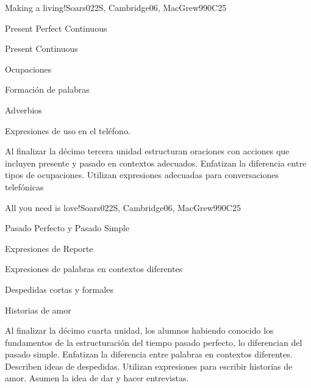 \begin{syllabus}
\begin{unit}{Making a living!}{}{Soars022S, Cambridge06, MacGrew99}{0}{C25}
   \begin{topics}
      \item Present Perfect Continuous
      \item Present Continuous
      \item Ocupaciones 
      \item Formación de palabras
      \item Adverbios
      \item Expresiones de uso en el teléfono.
   \end{topics}

   \begin{learningoutcomes}
      \item Al finalizar la décimo tercera unidad estructuran oraciones con acciones que incluyen presente y pasado en contextos adecuados. Enfatizan la diferencia entre tipos de ocupaciones. Utilizan expresiones adecuadas para conversaciones telefónicas
   \end{learningoutcomes}
\end{unit}

\begin{unit}{All you need is love!}{}{Soars022S, Cambridge06, MacGrew99}{0}{C25}
   \begin{topics}
      \item Pasado Perfecto y Pasado Simple
      \item Expresiones de Reporte
      \item Expresiones de palabras en contextos diferentes 
      \item Despedidas cortas y formales 
      \item Historias de amor
   \end{topics}

   \begin{learningoutcomes}
      \item Al finalizar la décimo cuarta unidad, los alumnos habiendo conocido los fundamentos de la estructuración del tiempo pasado perfecto, lo diferencian del pasado simple. Enfatizan la diferencia entre palabras en contextos diferentes. Describen ideas de despedidas. Utilizan expresiones para escribir historias de amor. Asumen la idea de dar y hacer entrevistas.
   \end{learningoutcomes}
\end{unit}



\begin{coursebibliography}
\end{coursebibliography}

\end{syllabus}
%
